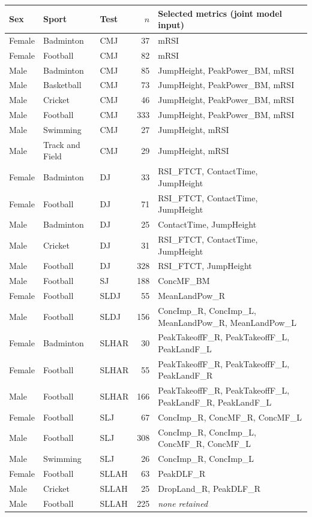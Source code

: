 \begin{tabular}{lllrl}
\toprule
Sex & Sport & Test & $n$ & Selected metrics (joint model input) \\
\midrule
Female & Badminton & CMJ & 37 & mRSI \\
Female & Football & CMJ & 82 & mRSI \\
Male & Badminton & CMJ & 85 & JumpHeight, PeakPower\_BM, mRSI \\
Male & Basketball & CMJ & 73 & JumpHeight, PeakPower\_BM, mRSI \\
Male & Cricket & CMJ & 46 & JumpHeight, PeakPower\_BM, mRSI \\
Male & Football & CMJ & 333 & JumpHeight, PeakPower\_BM, mRSI \\
Male & Swimming & CMJ & 27 & JumpHeight, mRSI \\
Male & Track and Field & CMJ & 29 & JumpHeight, mRSI \\
\addlinespace[1pt]
Female & Badminton & DJ & 33 & RSI\_FTCT, ContactTime, JumpHeight \\
Female & Football & DJ & 71 & RSI\_FTCT, ContactTime, JumpHeight \\
Male & Badminton & DJ & 25 & ContactTime, JumpHeight \\
Male & Cricket & DJ & 31 & RSI\_FTCT, ContactTime, JumpHeight \\
Male & Football & DJ & 328 & RSI\_FTCT, JumpHeight \\
\addlinespace[1pt]
Male & Football & SJ & 188 & ConcMF\_BM \\
\addlinespace[1pt]
Female & Football & SLDJ & 55 & MeanLandPow\_R \\
Male & Football & SLDJ & 156 & ConcImp\_R, ConcImp\_L, MeanLandPow\_R, MeanLandPow\_L \\
\addlinespace[1pt]
Female & Badminton & SLHAR & 30 & PeakTakeoffF\_R, PeakTakeoffF\_L, PeakLandF\_L \\
Female & Football & SLHAR & 55 & PeakTakeoffF\_R, PeakTakeoffF\_L, PeakLandF\_R \\
Male & Football & SLHAR & 166 & PeakTakeoffF\_R, PeakTakeoffF\_L, PeakLandF\_R, PeakLandF\_L \\
\addlinespace[1pt]
Female & Football & SLJ & 67 & ConcImp\_R, ConcMF\_R, ConcMF\_L \\
Male & Football & SLJ & 308 & ConcImp\_R, ConcImp\_L, ConcMF\_R, ConcMF\_L \\
Male & Swimming & SLJ & 26 & ConcImp\_R, ConcImp\_L \\
\addlinespace[1pt]
Female & Football & SLLAH & 63 & PeakDLF\_R \\
Male & Cricket & SLLAH & 25 & DropLand\_R, PeakDLF\_R \\
Male & Football & SLLAH & 225 & \emph{none retained} \\
\bottomrule
\end{tabular}
